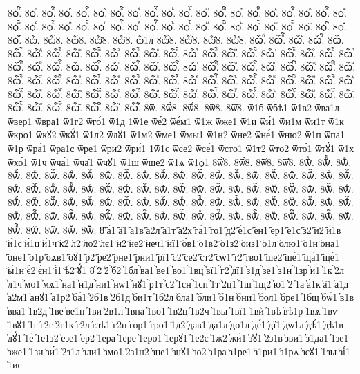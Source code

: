 {8ѻⷵ҇.
8ѻⷶ.
8ѻⷶ҇.
8ѻⷷ.
8ѻⷷ҇.
8ѻⷸ.
8ѻⷸ҇.
8ѻⷹ.
8ѻⷹ҇.
8ѻⷺ.
8ѻⷺ҇.
8ѻⷻ.
8ѻⷻ҇.
8ѻⷼ.
8ѻⷼ҇.
8ѻⷽ.
8ѻⷽ҇.
8ѻⷾ.
8ѻⷾ҇.
8ѻⷿ.
8ѻⷿ҇.
8ѻꙴ.
8ѻꙴ҇.
8ѻꙵ.
8ѻꙵ҇.
8ѻꙶ.
8ѻꙶ҇.
8ѻꙷ.
8ѻꙷ҇.
8ѻꙸ.
8ѻꙸ҇.
8ѻꙹ.
8ѻꙹ҇.
8ѻꙺ.
8ѻꙺ҇.
8ѻꙻ.
8ѻꙻ҇.
8ѻ꙼.
8ѻ꙼҇.
8ѻ꙽.
8ѻ꙽҇.
8ѽ.
8ѽ̀8.
8ѽ́8.
8ѽ̈8.
8ѽ̑8.
ѽ1л
8ѽ҆̀8.
8ѽ҆́8.
8ѽ҆̈8.
8ѽ҆̑8.
8ѽⷠ.
8ѽⷠ҇.
8ѽⷡ.
8ѽⷡ҇.
8ѽⷢ.
8ѽⷢ҇.
8ѽⷣ.
8ѽⷣ҇.
8ѽⷤ.
8ѽⷤ҇.
8ѽⷥ.
8ѽⷥ҇.
8ѽⷦ.
8ѽⷦ҇.
8ѽⷧ.
8ѽⷧ҇.
8ѽⷨ.
8ѽⷨ҇.
8ѽⷩ.
8ѽⷩ҇.
8ѽⷪ.
8ѽⷪ҇.
8ѽⷫ.
8ѽⷫ҇.
8ѽⷬ.
8ѽⷬ҇.
8ѽⷭ.
8ѽⷭ҇.
8ѽⷮ.
8ѽⷮ҇.
8ѽⷯ.
8ѽⷯ҇.
8ѽⷰ.
8ѽⷰ҇.
8ѽⷱ.
8ѽⷱ҇.
8ѽⷲ.
8ѽⷲ҇.
8ѽⷳ.
8ѽⷳ҇.
8ѽⷴ.
8ѽⷴ҇.
8ѽⷵ.
8ѽⷵ҇.
8ѽⷶ.
8ѽⷶ҇.
8ѽⷷ.
8ѽⷷ҇.
8ѽⷸ.
8ѽⷸ҇.
8ѽⷹ.
8ѽⷹ҇.
8ѽⷺ.
8ѽⷺ҇.
8ѽⷻ.
8ѽⷻ҇.
8ѽⷼ.
8ѽⷼ҇.
8ѽⷽ.
8ѽⷽ҇.
8ѽⷾ.
8ѽⷾ҇.
8ѽⷿ.
8ѽⷿ҇.
8ѽꙴ.
8ѽꙴ҇.
8ѽꙵ.
8ѽꙵ҇.
8ѽꙶ.
8ѽꙶ҇.
8ѽꙷ.
8ѽꙷ҇.
8ѽꙸ.
8ѽꙸ҇.
8ѽꙹ.
8ѽꙹ҇.
8ѽꙺ.
8ѽꙺ҇.
8ѽꙻ.
8ѽꙻ҇.
8ѽ꙼.
8ѽ꙼҇.
8ѽ꙽.
8ѽ꙽҇.
8ѿ.
8ѿ̀8.
8ѿ́8.
8ѿ̈8.
8ѿ̑8.
ѿ1б
ѿбѣ1
ѿ1в2
ѿва1л
ѿвер1
ѿвра1
ѿ1г2
ѿго́1
ѿ1д
1ѿ1е
ѿе́2
ѿе́м1
ѿ1ж
ѿже1
ѿ1и
ѿи́1
ѿи1м
ѿи1т
ѿ1к
ѿкро1
ѿкꙋ2
ѿкꙋ́1
ѿ1л2
ѿлꙋ1
ѿ1м2
ѿме1
ѿмы1
ѿ1н2
ѿне2
ѿне́1
ѿню2
ѿ1п
ѿпа1
ѿ1р
ѿра́1
ѿра1с
ѿре1
ѿри2
ѿри́1
1ѿ1с
ѿсе2
ѿсе́1
ѿсто1
ѿ1т2
ѿто2
ѿто́1
ѿтꙋ́1
ѿ1х
ѿхо́1
ѿ1ч
ѿча́1
ѿча̑1
ѿчꙋ1
ѿ1ш
ѿше2
ѿ1ѧ
ѿ1ѻ1
8ѿ҆̀8.
8ѿ҆́8.
8ѿ҆̈8.
8ѿ҆̑8.
8ѿⷠ.
8ѿⷠ҇.
8ѿⷡ.
8ѿⷡ҇.
8ѿⷢ.
8ѿⷢ҇.
8ѿⷣ.
8ѿⷣ҇.
8ѿⷤ.
8ѿⷤ҇.
8ѿⷥ.
8ѿⷥ҇.
8ѿⷦ.
8ѿⷦ҇.
8ѿⷧ.
8ѿⷧ҇.
8ѿⷨ.
8ѿⷨ҇.
8ѿⷩ.
8ѿⷩ҇.
8ѿⷪ.
8ѿⷪ҇.
8ѿⷫ.
8ѿⷫ҇.
8ѿⷬ.
8ѿⷬ҇.
8ѿⷭ.
8ѿⷭ҇.
8ѿⷮ.
8ѿⷮ҇.
8ѿⷯ.
8ѿⷯ҇.
8ѿⷰ.
8ѿⷰ҇.
8ѿⷱ.
8ѿⷱ҇.
8ѿⷲ.
8ѿⷲ҇.
8ѿⷳ.
8ѿⷳ҇.
8ѿⷴ.
8ѿⷴ҇.
8ѿⷵ.
8ѿⷵ҇.
8ѿⷶ.
8ѿⷶ҇.
8ѿⷷ.
8ѿⷷ҇.
8ѿⷸ.
8ѿⷸ҇.
8ѿⷹ.
8ѿⷹ҇.
8ѿⷺ.
8ѿⷺ҇.
8ѿⷻ.
8ѿⷻ҇.
8ѿⷼ.
8ѿⷼ҇.
8ѿⷽ.
8ѿⷽ҇.
8ѿⷾ.
8ѿⷾ҇.
8ѿⷿ.
8ѿⷿ҇.
8ѿꙴ.
8ѿꙴ҇.
8ѿꙵ.
8ѿꙵ҇.
8ѿꙶ.
8ѿꙶ҇.
8ѿꙷ.
8ѿꙷ҇.
8ѿꙸ.
8ѿꙸ҇.
8ѿꙹ.
8ѿꙹ҇.
8ѿꙺ.
8ѿꙺ҇.
8ѿꙻ.
8ѿꙻ҇.
8ѿ꙼.
8ѿ꙼҇.
8ѿ꙽.
8ѿ꙽҇.
8҃
҃а́1
҃а̑1
҃а1в
҃а2л
҃а1т
҃а2х
҃га́1
҃го1
҃д2
҃е́1с
҃ен1
҃ер1
҃е1с
҃з2
҃и2
҃и́1в
҃и́1с
҃и́1ц
҃и́1ч
҃к2
҃л2
҃ло2
҃лє1
҃н2
҃не2
҃неч1
҃нї1
҃о́в1
҃о1в2
҃о1з2
҃оиз1
҃о1л
҃олю1
҃о1н
҃она1
҃оне1
҃о1р
҃оѧв1
҃оꙋ1
҃р2
҃ре2
҃рне1
҃рни1
҃рї1
҃с2
҃се2
҃ст2
҃сѡ1
҃т2
҃тво1
҃ше2
҃ше́1
҃ща́1
҃ще́1
҃ы́1н
҃є́2
҃є́н1
҃і́1
҃ѣ́2
҃ꙋ́1
8҆
҆2̀
҆2́
҆́б2
҆́1бл
҆́ва1
҆́ве1
҆́во1
҆́1вц
҆́вї1
҆́г2
҆́дї1
҆́з1д
҆́зе1
҆́з1н
҆́1зр
҆́и1
҆́1к
҆́2л
҆́л1ч
҆́мо1
҆́мѧ1
҆́на1
҆́н1д
҆́ни1
҆́нѡ1
҆́нꙋ1
҆́р1т
҆́с2
҆́1сн
҆́1сп
҆́1т
҆́2ц1
҆́1ш
҆́1щ2
҆́ю1
҆2̑
҆1а
҆а́1к
҆а̑1
҆а1д
҆а2м1
҆анꙋ1
҆а1р2
҆ба́1
҆2б1в
҆2б1д
҆би1т
҆1б2л
҆бла1
҆бли1
҆б1н
҆бни1
҆бол1
҆бре1
҆1бщ
҆бѡ́1
҆в1в
҆вва1
҆1в2д
҆1ве
҆ве1н
҆1ви
҆2в1л
҆1вна
҆1во1
҆1в2ц
҆1в2ч
҆1вы
҆1вї1
҆1вѝ
҆1вѣ
҆вѣ1р
҆1вѧ
҆1вѵ
҆1вꙋ1
҆1г
҆г2г
҆2г1к
҆г2л
҆глѣ1
҆г2н
҆гор1
҆гро1
҆1д2
҆дав1
҆да1л
҆до1л
҆дє́1
҆дї1
҆дѡ1л
҆дѣ́1
҆дѣ1в
҆дꙋ́1
҆1е́
҆1е1з2
҆езе1
҆ер2
҆1ера
҆1ере
҆1еро1
҆1ерꙋ1
҆1е2с
҆1ж2
҆жи́1
҆з̾ꙋ1
҆2з1в
҆зви1
҆з1да1
҆1зе1
҆зже1
҆1зи
҆зи́1
҆2з1л
҆зли1
҆змо1
҆2з1н2
҆зне1
҆знꙋ1
҆зо2
҆з1ра
҆з1ре1
҆з1ри1
҆з1рѧ
҆зсꙋ1
҆1зы
҆зі́1
҆1ис
}
